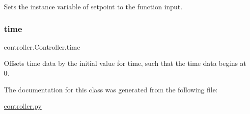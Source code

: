 Sets the instance variable of setpoint to the function input. 

\mbox{\label{classcontroller_1_1_controller_a2cfb3777cd10bf5fa09cc73af41bb133}} 
\subsubsection{\texorpdfstring{time}{time}}
{\footnotesize\ttfamily controller.\+Controller.\+time}



Offsets time data by the initial value for time, such that the time data begins at 0. 



The documentation for this class was generated from the following file\+:\begin{DoxyCompactItemize}
\item 
\mbox{\hyperlink{controller_8py}{controller.\+py}}\end{DoxyCompactItemize}
